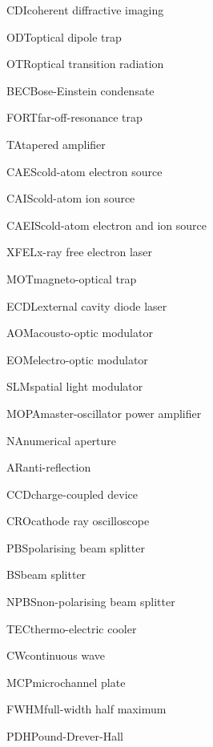     {CDI}{coherent diffractive imaging}

    {ODT}{optical dipole trap}

    {OTR}{optical transition radiation}
    
    {BEC}{Bose-Einstein condensate}

    {FORT}{far-off-resonance trap}

    {TA}{tapered amplifier}

    {CAES}{cold-atom electron source}

    {CAIS}{cold-atom ion source}

    {CAEIS}{cold-atom electron and ion source}

    {XFEL}{x-ray free electron laser}

    {MOT}{magneto-optical trap}

    {ECDL}{external cavity diode laser}

    {AOM}{acousto-optic modulator}

    {EOM}{electro-optic modulator}

    {SLM}{spatial light modulator}

    {MOPA}{master-oscillator power amplifier}

    {NA}{numerical aperture}

    {AR}{anti-reflection}

    {CCD}{charge-coupled device}

    {CRO}{cathode ray oscilloscope}

    {PBS}{polarising beam splitter}

    {BS}{beam splitter}

    {NPBS}{non-polarising beam splitter}

    {TEC}{thermo-electric cooler}

    {CW}{continuous wave}

    {MCP}{microchannel plate}

    {FWHM}{full-width half maximum}

    {PDH}{Pound-Drever-Hall}


